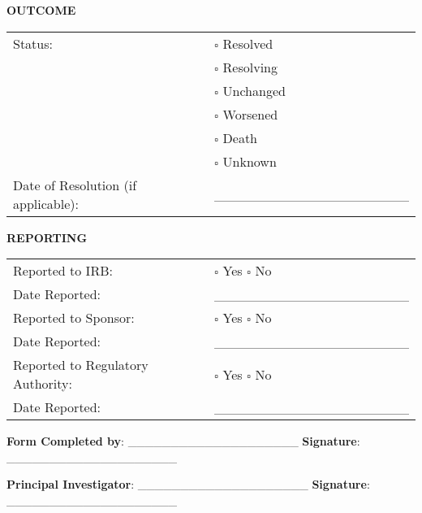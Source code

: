 \begin{tcolorbox}[title=Adverse Event Reporting Form]
\vspace{0.5cm}

\textbf{OUTCOME}

\begin{tabular}{p{7cm}p{7cm}}
Status: & $\square$ Resolved \\
 & $\square$ Resolving \\
 & $\square$ Unchanged \\
 & $\square$ Worsened \\
 & $\square$ Death \\
 & $\square$ Unknown \\[0.3cm]
Date of Resolution (if applicable): & \_\_\_\_\_\_\_\_\_\_\_\_\_\_\_\_\_\_\_\_ \\[0.3cm]
\end{tabular}

\vspace{0.5cm}

\textbf{REPORTING}

\begin{tabular}{p{7cm}p{7cm}}
Reported to IRB: & $\square$ Yes \hspace{0.5cm} $\square$ No \\[0.3cm]
Date Reported: & \_\_\_\_\_\_\_\_\_\_\_\_\_\_\_\_\_\_\_\_ \\[0.3cm]
Reported to Sponsor: & $\square$ Yes \hspace{0.5cm} $\square$ No \\[0.3cm]
Date Reported: & \_\_\_\_\_\_\_\_\_\_\_\_\_\_\_\_\_\_\_\_ \\[0.3cm]
Reported to Regulatory Authority: & $\square$ Yes \hspace{0.5cm} $\square$ No \\[0.3cm]
Date Reported: & \_\_\_\_\_\_\_\_\_\_\_\_\_\_\_\_\_\_\_\_ \\[0.3cm]
\end{tabular}

\vspace{0.5cm}

\textbf{Form Completed by}: \_\_\_\_\_\_\_\_\_\_\_\_\_\_\_\_\_\_\_\_ \hfill \textbf{Signature}: \_\_\_\_\_\_\_\_\_\_\_\_\_\_\_\_\_\_\_\_

\vspace{0.5cm}

\textbf{Principal Investigator}: \_\_\_\_\_\_\_\_\_\_\_\_\_\_\_\_\_\_\_\_ \hfill \textbf{Signature}: \_\_\_\_\_\_\_\_\_\_\_\_\_\_\_\_\_\_\_\_
\end{tcolorbox}